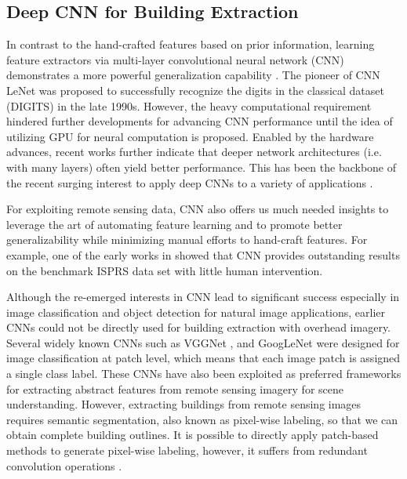 \documentclass[journal]{IEEEtran}
\begin{document}
\subsection{Deep CNN for Building Extraction}
In contrast to the hand-crafted features based on prior information, learning feature extractors via multi-layer convolutional neural network (CNN) demonstrates a more powerful generalization capability  \cite{Goodfellow2016}. The pioneer of CNN LeNet \cite{LeCunBottouBengioEtAl1998} was proposed to successfully recognize the digits in the classical dataset (DIGITS) in the late 1990s. However, the heavy computational requirement hindered further developments for advancing CNN performance until the idea of utilizing GPU for neural computation is proposed. Enabled by the hardware advances, recent works further indicate that deeper network architectures (i.e. with many layers) often yield better performance. This has been the backbone of the recent surging interest to apply deep CNNs to a variety of applications \cite{SimonyanZisserman2015,SzegedyLiuJiaEtAl2015,KarpathyTodericiShettyEtAl2014,OquabBottouLaptevEtAl2014,SainathKingsburySaonEtAl2015}.

For exploiting remote sensing data, CNN also offers us much needed insights to leverage the art of automating feature learning and to promote better generalizability while minimizing manual efforts to hand-craft features. For example, one of the early works in \cite{PaisitkriangkraiSherrahJanneyEtAl2016} showed that CNN provides outstanding results on the benchmark ISPRS data set with little human intervention.

Although the re-emerged interests in CNN lead to significant success especially in image classification and object detection for natural image applications, earlier CNNs could not be directly used for building extraction with overhead imagery. Several widely known CNNs such as VGGNet \cite{Simonyan2015}, and GoogLeNet \cite{SzegedyLiuJiaEtAl2015} were designed for image classification at patch level, which means that each image patch is assigned a single class label. These CNNs have also been exploited as preferred frameworks for extracting abstract features from remote sensing imagery for scene understanding. However, extracting buildings from remote sensing images requires semantic segmentation, also known as pixel-wise labeling, so that we can obtain complete building outlines. It is possible to directly apply patch-based methods to generate pixel-wise labeling, however, it suffers from redundant convolution operations \cite{ShelhamerLongDarrell2017}. 
\end{document}
